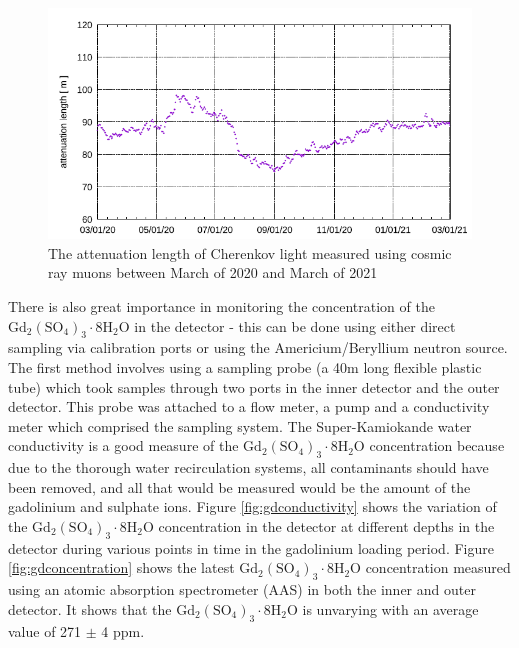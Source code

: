 \begin{figure}[H]
    \includegraphics[width=\textwidth]{Figures/attenuation_length_gd.png}
    \caption{The attenuation length of Cherenkov light measured using cosmic ray muons between March of 2020 and March of 2021}
    \label{fig:gdattenuationlength}
\end{figure}



There is also great importance in monitoring the concentration of the $\mathrm{Gd}_{2}\left(\mathrm{SO}_{4}\right)_{3} \cdot 8 \mathrm{H}_{2} \mathrm{O}$ in the detector - this can be done using either direct sampling via calibration ports or using the Americium/Beryllium neutron source. The first method involves using a sampling probe (a 40m long flexible plastic tube) which took samples through two ports in the inner detector and the outer detector. This probe was attached to a flow meter, a pump and a conductivity meter which comprised the sampling system. The Super-Kamiokande water conductivity is a good measure of the  $\mathrm{Gd}_{2}\left(\mathrm{SO}_{4}\right)_{3} \cdot 8 \mathrm{H}_{2} \mathrm{O}$ concentration because due to the thorough water recirculation systems, all contaminants should have been removed, and all that would be measured would be the amount of the gadolinium and sulphate ions. Figure \ref{fig:gdconductivity} shows the variation of the $\mathrm{Gd}_{2}\left(\mathrm{SO}_{4}\right)_{3} \cdot 8 \mathrm{H}_{2} \mathrm{O}$ concentration in the detector at different depths in the detector during various points in time in the gadolinium loading period. Figure \ref{fig:gdconcentration} shows the latest $\mathrm{Gd}_{2}\left(\mathrm{SO}_{4}\right)_{3} \cdot 8 \mathrm{H}_{2} \mathrm{O}$  concentration measured using an atomic absorption spectrometer (AAS) in both the inner and outer detector. It shows that the $\mathrm{Gd}_{2}\left(\mathrm{SO}_{4}\right)_{3} \cdot 8 \mathrm{H}_{2} \mathrm{O}$ is unvarying with an average value of 271 $\pm$ 4 ppm. 



